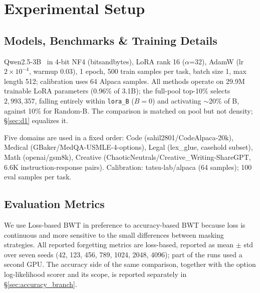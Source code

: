 \section{Experimental Setup}
\label{sec:setup}

\subsection{Models, Benchmarks \& Training Details}
\label{sec:models}

Qwen2.5-3B~\citep{qwen2024qwen25} in 4-bit NF4 (bitsandbytes), LoRA rank 16 ($\alpha$=32), AdamW (lr $2\times10^{-4}$, warmup 0.03), 1 epoch, 500 train samples per task, batch size 1, max length 512; calibration uses 64 Alpaca samples. All methods operate on 29.9M trainable LoRA parameters (0.96\% of 3.1B); the full-pool top-10\% selects $2{,}993{,}357$, falling entirely within \texttt{lora\_B} ($B=0$) and activating $\sim$20\% of B, against 10\% for Random-B. The comparison is matched on pool but not density; \S\ref{sec:d1} equalizes it.

Five domains are used in a fixed order: Code (sahil2801/CodeAlpaca-20k), Medical (GBaker/MedQA-USMLE-4-options), Legal (lex\_glue, casehold subset), Math (openai/gsm8k), Creative (ChaoticNeutrals/Creative\_Writing-ShareGPT, 6.6K instruction-response pairs). Calibration: tatsu-lab/alpaca (64 samples); 100 eval samples per task.

\subsection{Evaluation Metrics}
\label{sec:metrics}

We use Loss-based BWT in preference to accuracy-based BWT because loss is continuous and more sensitive to the small differences between masking strategies. 
All reported forgetting metrics are loss-based, reported as mean $\pm$ std over seven seeds (42, 123, 456, 789, 1024, 2048, 4096); part of the runs used a second GPU. The accuracy side of the same comparison, together with the option log-likelihood scorer and its scope, is reported separately in \S\ref{sec:accuracy_branch}.
